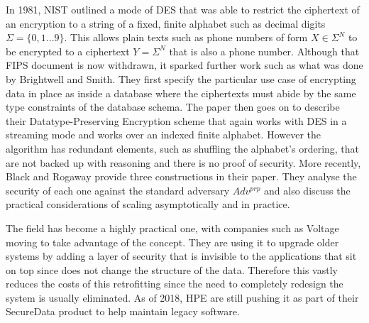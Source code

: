 \documentclass[10pt,a4paper]{article}
\begin{document}
In 1981, NIST\cite{FIPS74} outlined a mode of DES that was able to restrict the ciphertext of an encryption to a string of a fixed, finite alphabet such as decimal digits $ \Sigma = \{0,1...9\} $. This allows plain texts such as phone numbers of form $ X \in \Sigma^N $ to be encrypted to a ciphertext $ Y = \Sigma^N $ that is also a phone number. Although that FIPS document is now withdrawn, it sparked further work such as what was done by Brightwell and Smith\cite{DPE}. They first specify the particular use case of encrypting data in place as inside a database where the ciphertexts must abide by the same type constraints of the database schema. The paper then goes on to describe their  Datatype-Preserving Encryption scheme that again works with DES in a streaming mode and works over an indexed finite alphabet. However the algorithm has redundant elements, such as shuffling the alphabet's ordering, that are not backed up with reasoning and there is no proof of security. More recently, Black and Rogaway\cite{CAFD} provide three constructions in their paper. They analyse the security of each one against the standard adversary $Adv^{prp}$ and also discuss the practical considerations of scaling asymptotically and in practice.

The field has become a highly practical one, with companies such as Voltage moving to take advantage of the concept. They are using it to upgrade older systems by adding a layer of security that is invisible to the applications that sit on top since does not change the structure of the data. Therefore this vastly reduces the costs of this retrofitting since the need to completely redesign the system is usually eliminated. As of 2018, HPE\cite{hp} are still pushing it as part of their SecureData product to help maintain legacy software.
\end{document}
